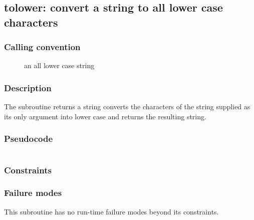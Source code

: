 \clearpage
{}
{}
\label{subr:tolower}
\subsection*{tolower: convert a string to all lower case characters}

\subsubsection*{Calling convention}

\begin{description}
\item[] an all lower case string
\end{description}

\subsubsection*{Description}

The  subroutine returns a string converts the
characters of the string supplied as its only argument into lower case
and returns the resulting string.

\subsubsection*{Pseudocode}

\begin{verbatim}
\end{verbatim}

\subsubsection*{Constraints}

\subsubsection*{Failure modes}

This subroutine has no run-time failure modes beyond its constraints.

